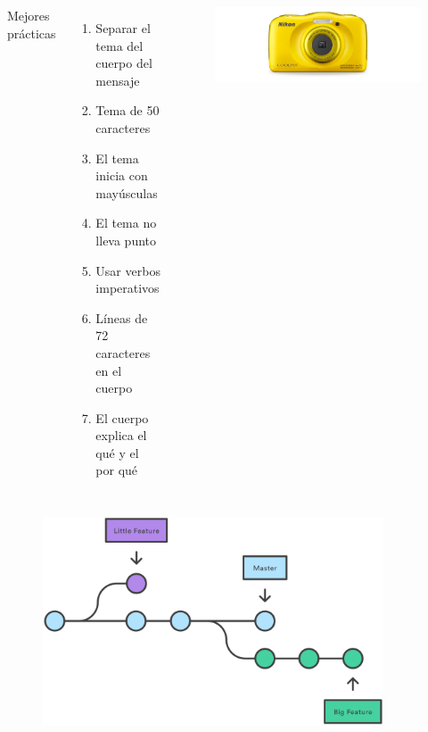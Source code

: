 \documentclass{beamer}
\begin{document}
\begin{frame}
  \begin{center}
    \resizebox{\textwidth}{!}{\FiraTitle \color{purple}{git commit}}
  \end{center}

  \begin{columns}
    {\FiraTitle Mejores prácticas}
    \begin{enumerate}
    \item Separar el tema del cuerpo del mensaje
    \item Tema de 50 caracteres
    \item El tema inicia con mayúsculas
    \item El tema no lleva punto
    \item Usar verbos imperativos
    \item Líneas de 72 caracteres en el cuerpo
    \item El cuerpo explica el qué y el por qué
    \end{enumerate}

    \begin{figure}
      \centering
      \includegraphics[width=\textwidth]{camera}
    \end{figure}
  \end{columns}
\end{frame}

\begin{frame}
  \begin{center}
    \resizebox{0.7\textwidth}{!}{\FiraTitle \color{green}{Branching}}
  \end{center}
  \begin{figure}
    \centering
    \includegraphics[width=0.9\textwidth]{ramas}
  \end{figure}
\end{frame}
\end{document}
